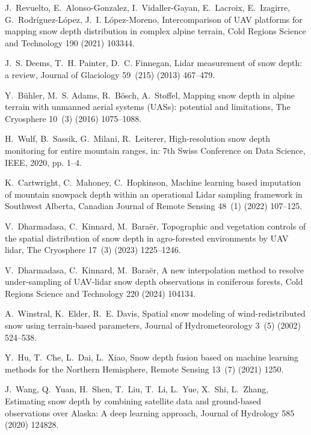 \documentclass[preprint,12pt]{elsarticle}
\begin{document}
J.~Revuelto, E.~Alonso-Gonzalez, I.~Vidaller-Gayan, E.~Lacroix, E.~Izagirre, G.~Rodríguez-López, J.~I. López-Moreno, {Intercomparison of UAV platforms for mapping snow depth distribution in complex alpine terrain}, Cold Regions Science and Technology 190 (2021) 103344.

J.~S. Deems, T.~H. Painter, D.~C. Finnegan, Lidar measurement of snow depth: a review, Journal of Glaciology 59~(215) (2013) 467--479.

Y.~Bühler, M.~S. Adams, R.~Bösch, A.~Stoffel, {Mapping snow depth in alpine terrain with unmanned aerial systems (UASs): potential and limitations}, The Cryosphere 10~(3) (2016) 1075--1088.

H.~Wulf, B.~Sassik, G.~Milani, R.~Leiterer, High-resolution snow depth monitoring for entire mountain ranges, in: 7th Swiss Conference on Data Science, IEEE, 2020, pp. 1--4.

K.~Cartwright, C.~Mahoney, C.~Hopkinson, {Machine learning based imputation of mountain snowpack depth within an operational Lidar sampling framework in Southwest Alberta}, Canadian Journal of Remote Sensing 48~(1) (2022) 107--125.

V.~Dharmadasa, C.~Kinnard, M.~Bara\"er, {Topographic and vegetation controls of the spatial distribution of snow depth in agro-forested environments by UAV lidar}, The Cryosphere 17~(3) (2023) 1225--1246.

V.~Dharmadasa, C.~Kinnard, M.~Bara{\"e}r, {A new interpolation method to resolve under-sampling of UAV-lidar snow depth observations in coniferous forests}, Cold Regions Science and Technology 220 (2024) 104134.

A.~Winstral, K.~Elder, R.~E. Davis, Spatial snow modeling of wind-redistributed snow using terrain-based parameters, Journal of Hydrometeorology 3~(5) (2002) 524--538.

Y.~Hu, T.~Che, L.~Dai, L.~Xiao, {Snow depth fusion based on machine learning methods for the Northern Hemisphere}, Remote Sensing 13~(7) (2021) 1250.

J.~Wang, Q.~Yuan, H.~Shen, T.~Liu, T.~Li, L.~Yue, X.~Shi, L.~Zhang, {Estimating snow depth by combining satellite data and ground-based observations over Alaska: A deep learning approach}, Journal of Hydrology 585 (2020) 124828.
\end{document}
